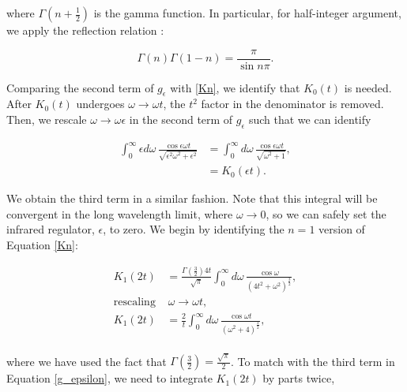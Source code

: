 \documentclass{article}
\numberwithin{equation}{section} %
\begin{document}
\noindent where $\Gamma(n+\frac{1}{2})$ is the gamma function. In particular, for half-integer argument, we apply the reflection relation \cite{reflection}:

\begin{equation}
\Gamma(n)\Gamma(1-n) = \frac{\pi}{\sin n\pi}.
\end{equation}

Comparing the second term of $g_\epsilon$ with \ref{Kn}, we identify that $K_0(t)$ is needed. After $K_0(t)$ undergoes $\omega \rightarrow \omega t$, the $t^2$ factor in the denominator is removed. Then,  we rescale $\omega \rightarrow \omega\epsilon$ in the second term of $g_\epsilon$ such that we can identify

\begin{align*}
\int^\infty_0 \epsilon d\omega \, \frac{\cos \epsilon\omega t}{\sqrt{\epsilon^2\omega^2 + \epsilon^2}} & = \int^\infty_0 d\omega \, \frac{\cos \epsilon\omega t}{\sqrt{\omega^2 + 1}},\\
&= K_0(\epsilon t).
\end{align*}

We obtain the third term in a similar fashion. Note that this integral will be convergent in the long wavelength limit, where $\omega\rightarrow 0$, so we can safely set the infrared regulator, $\epsilon$, to zero. We begin by identifying the $n=1$ version of Equation \ref{Kn}:

\begin{equation}
\begin{split}
K_1(2t) &= \frac{\Gamma(\frac{3}{2})4t}{\sqrt{\pi}} \int^\infty_0 d\omega\, 
\frac{\cos \omega }{(4t^2 + \omega^2)^{\frac{3}{2}}},\\
\mathrm{rescaling}\,&\, \omega \rightarrow \omega t,\\
K_1(2t) &=\frac{2}{t} \int^\infty_0 d\omega\, 
\frac{\cos \omega t}{(\omega^2+4)^{\frac{3}{2}}},\\
\end{split}
\label{K1}
\end{equation}

\noindent where we have used the fact that  $\Gamma(\frac{3}{2})=\frac{\sqrt{\pi}}{2}$. To match with the third term in Equation \ref{g_epsilon}, we need to integrate $K_1(2t)$ by parts twice,
\end{document}
